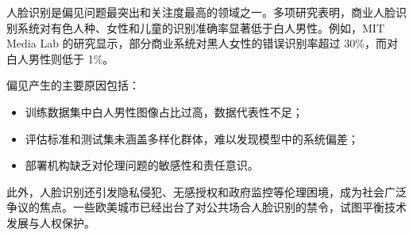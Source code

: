 
人脸识别是偏见问题最突出和关注度最高的领域之一。多项研究表明，商业人脸识别系统对有色人种、女性和儿童的识别准确率显著低于白人男性\cite{Buolamwini2018GenderShades}。例如，MIT Media Lab 的研究显示，部分商业系统对黑人女性的错误识别率超过 30\%，而对白人男性则低于 1\%。

偏见产生的主要原因包括：

\begin{itemize}
	\item 训练数据集中白人男性图像占比过高，数据代表性不足；
	\item 评估标准和测试集未涵盖多样化群体，难以发现模型中的系统偏差；
	\item 部署机构缺乏对伦理问题的敏感性和责任意识。
\end{itemize}

此外，人脸识别还引发隐私侵犯、无感授权和政府监控等伦理困境，成为社会广泛争议的焦点。一些欧美城市已经出台了对公共场合人脸识别的禁令，试图平衡技术发展与人权保护。